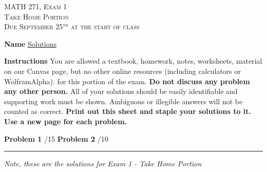 \documentclass[12pt]{amsbook}
\begin{document}

\begin{center}
   \textsc{\large MATH 271, Exam 1}\\
   \textsc{Take Home Portion}\\
   \textsc{Due September 25$^\textrm{th}$ at the start of class}
\end{center}
\vspace{1cm}

\noindent\textbf{Name} \; \underline{Solutions \hspace{6.5cm}}

\vspace{1cm}

\noindent\textbf{Instructions} \; You are allowed a textbook, homework, notes, worksheets, material on our Canvas page, but no other online resources (including calculators or WolframAlpha). for this portion of the exam.  \textbf{Do not discuss any problem any other person.} All of your solutions should be easily identifiable and supporting work must be shown.  Ambiguous or illegible answers will not be counted as correct. \textbf{Print out this sheet and staple your solutions to it. Use a new page for each problem.}


\vspace{1cm}

\begin{center}\textbf{Problem 1} \; \underline{\hspace{1cm}}/15 \qquad \qquad \textbf{Problem 2} \; \underline{\hspace{1cm}}/10\end{center}

\vspace{1cm}

\hrule

\vspace*{1cm}
\noindent\emph{Note, these are the solutions for Exam 1 - Take Home Portion}
\end{document}
